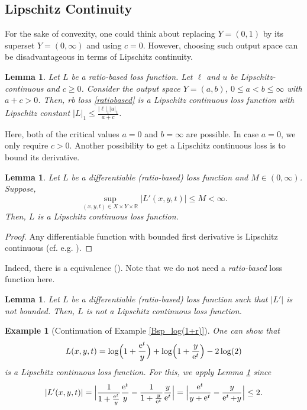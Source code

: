\documentclass[10pt]{article}
\newcommand{\R}{\mathbb{R}}
\newcommand{\XY}{X \times Y}
\DeclareMathOperator{\e}{e}
\newtheorem{lemma}[theorem]{Lemma}
\newtheorem{example}[theorem]{Example}
\begin{document}
\subsection{Lipschitz Continuity}
For the sake of convexity, one could think about replacing $Y = (0,1)$ by its superset $Y = (0,\infty)$ and using $c = 0$.
However, choosing such output space can be disadvantageous in terms of Lipschitz continuity.
\begin{lemma} \label{LipschitzL} 
	Let $L$ be a ratio-based loss function. 
	Let $\ell$ and $u$ be Lipschitz-continuous and $c \geq 0$. 
	Consider the output space $Y = (a, b)$, $0 \leq a < b \leq \infty$  with $a + c > 0$. 
	Then, rb loss \eqref{ratiobased} is a Lipschitz continuous loss function with Lipschitz constant $|L|_1 \leq \frac{|\ell|_1 |u|_1}{a+c}$.
\end{lemma}
Here, both of the critical values $a = 0$ and $b = \infty$ are possible.
In case $a = 0$, we only require $c > 0$. 
Another possibility to get a Lipschitz continuous loss is to bound its derivative.
\begin{lemma} \label{Lemma_Lipschitz_beschrAbl}
	Let $L$ be a differentiable (ratio-based) loss function and $M \in (0, \infty)$. Suppose,
	\begin{equation*}
		\sup_{(x,y,t) \in \XY \times \R} |L'(x,y,t)| \leq M < \infty.
	\end{equation*}
	Then, $L$ is a Lipschitz continuous loss function.
\end{lemma}
\begin{proof}
	Any differentiable function with bounded first derivative is Lipschitz continuous (cf. e.g. \cite[p. 147]{Königsberger2004}).
\end{proof}
Indeed, there is a equivalence (\cite[Chapter 1, Thm. 7.3]{ClarkeEtAl1998}).
Note that we do not need a \emph{ratio-based} loss function here. 
\begin{lemma} \label{Lemma_Lipschitz_beschrAbl2}
	Let $L$ be a differentiable (ratio-based) loss function such that $|L'|$ is not bounded. Then, $L$ is not a Lipschitz continuous loss function.
\end{lemma}
\begin{example}[Continuation of Example \ref{Bsp_log(1+r)}]
	One can show that
	\begin{equation*}
		L(x,y,t) = \log\Bigl(1+\frac{\e^t}{y}\Bigr) + \log\Bigl(1+\frac{y}{\e^t}\Bigr) - 2\log(2)
	\end{equation*}
	is a Lipschitz continuous loss function. 
	For this, we apply Lemma \ref{Lemma_Lipschitz_beschrAbl} since
	\begin{equation*}
		|L'(x,y,t)| = \Bigl|\frac{1}{1+\frac{\e^t}{y}} \frac{\e^t}{y} - \frac{1}{1+\frac{y}{\e^t}}\frac{y}{\e^t}\Bigr| = \Bigl|\frac{\e^t}{y+\e^t} - \frac{y}{\e^t+y}\Bigr|\leq 2.
	\end{equation*}
\end{example}
\end{document}
